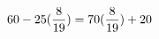 \documentclass[preview]{standalone}
\begin{document}
\begin{align*}
\special{dvisvgm:raw <g id='unique000'>}60 - 25 (\frac{8}{19}) = 70 (\frac{8}{19}) + 20\special{dvisvgm:raw </g>}
\end{align*}
\end{document}
